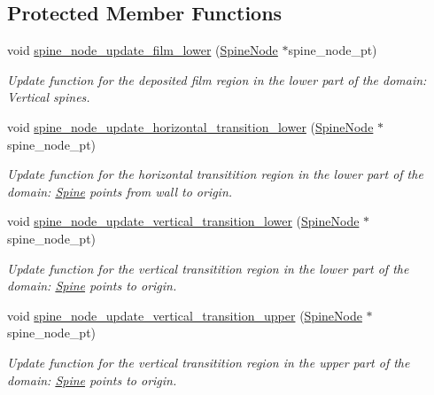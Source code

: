 \subsection*{Protected Member Functions}
\begin{DoxyCompactItemize}
\item 
void \hyperlink{classoomph_1_1BrethertonSpineMesh_a0446cb0efaa31739f51ae0534a73d116}{spine\+\_\+node\+\_\+update\+\_\+film\+\_\+lower} (\hyperlink{classoomph_1_1SpineNode}{Spine\+Node} $\ast$spine\+\_\+node\+\_\+pt)
\begin{DoxyCompactList}\small\item\em Update function for the deposited film region in the lower part of the domain\+: Vertical spines. \end{DoxyCompactList}\item 
void \hyperlink{classoomph_1_1BrethertonSpineMesh_a0dc35290fc96a075d864e79528e5fec8}{spine\+\_\+node\+\_\+update\+\_\+horizontal\+\_\+transition\+\_\+lower} (\hyperlink{classoomph_1_1SpineNode}{Spine\+Node} $\ast$spine\+\_\+node\+\_\+pt)
\begin{DoxyCompactList}\small\item\em Update function for the horizontal transitition region in the lower part of the domain\+: \hyperlink{classoomph_1_1Spine}{Spine} points from wall to origin. \end{DoxyCompactList}\item 
void \hyperlink{classoomph_1_1BrethertonSpineMesh_a9ec578183760e386ed5229ba193e1fdf}{spine\+\_\+node\+\_\+update\+\_\+vertical\+\_\+transition\+\_\+lower} (\hyperlink{classoomph_1_1SpineNode}{Spine\+Node} $\ast$spine\+\_\+node\+\_\+pt)
\begin{DoxyCompactList}\small\item\em Update function for the vertical transitition region in the lower part of the domain\+: \hyperlink{classoomph_1_1Spine}{Spine} points to origin. \end{DoxyCompactList}\item 
void \hyperlink{classoomph_1_1BrethertonSpineMesh_a6ddc62166abfd621219551957c9b1103}{spine\+\_\+node\+\_\+update\+\_\+vertical\+\_\+transition\+\_\+upper} (\hyperlink{classoomph_1_1SpineNode}{Spine\+Node} $\ast$spine\+\_\+node\+\_\+pt)
\begin{DoxyCompactList}\small\item\em Update function for the vertical transitition region in the upper part of the domain\+: \hyperlink{classoomph_1_1Spine}{Spine} points to origin. \end{DoxyCompactList}\item 

\end{DoxyCompactItemize}

